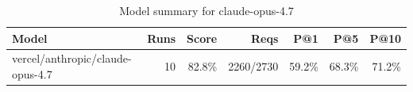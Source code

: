 \begin{table}[htbp]
\centering
\begin{tabular}{lrrrrrr}
\toprule
Model & Runs & Score & Reqs & P@1 & P@5 & P@10 \\
\midrule
vercel/anthropic/claude-opus-4.7 & 10 & 82.8\% & 2260/2730 & 59.2\% & 68.3\% & 71.2\% \\
\bottomrule
\end{tabular}
\caption{Model summary for claude-opus-4.7}
\end{table}
